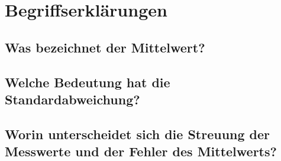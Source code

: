 \section{Begriffserklärungen}
\label{sec:Begriffe}

\subsection{Was bezeichnet der Mittelwert?}
\label{ssec:Mittelwert}

\subsection{Welche Bedeutung hat die Standardabweichung?}
\label{ssec:Standardabweichung}

\subsection{Worin unterscheidet sich die Streuung der Messwerte und der Fehler des Mittelwerts?}
\label{ssec:Streuung-Fehler}